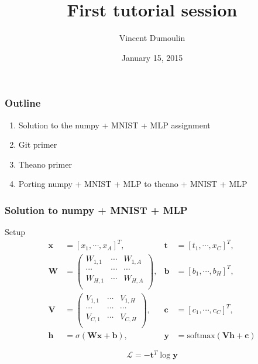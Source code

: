 \documentclass[mathserif, xcolor=dvipsnames]{beamer}
\title{First tutorial session}
\author{Vincent Dumoulin}
\date{January 15, 2015}
\begin{document}
\begin{frame}[plain]
    \titlepage
\end{frame}

\begin{frame}
    \frametitle{Outline}
    \begin{enumerate}\addtolength{\itemsep}{1.5\baselineskip}
        \item{Solution to the numpy + MNIST + MLP assignment}
        \item{Git primer}
        \item{Theano primer}
        \item{Porting numpy + MNIST + MLP to theano + MNIST + MLP}
    \end{enumerate}
\end{frame}

\begin{frame}
    \frametitle{Solution to numpy + MNIST + MLP}

    \begin{block}{Setup}
    \begin{align*}
        \mathbf{x} &= [x_1, \cdots, x_A]^T,
        &\mathbf{t} &= [t_1, \cdots, x_C]^T, \\
        \mathbf{W} &= \begin{pmatrix}
            W_{1,1} & \cdots & W_{1,A} \\
            \cdots  & \cdots & \cdots  \\
            W_{H,1} & \cdots & W_{H,A} \\
        \end{pmatrix},
        &\mathbf{b} &= [b_1, \cdots, b_H]^T, \\
        \mathbf{V} &= \begin{pmatrix}
            V_{1,1} & \cdots & V_{1,H} \\
            \cdots  & \cdots & \cdots  \\
            V_{C,1} & \cdots & V_{C,H} \\
        \end{pmatrix},
        &\mathbf{c} &= [c_1, \cdots, c_C]^T, \\
        \mathbf{h} &= \sigma(\mathbf{W}\mathbf{x} + \mathbf{b}),
        &\mathbf{y} &= \textrm{softmax}(\mathbf{V}\mathbf{h} + \mathbf{c})
    \end{align*}

    \begin{equation*}
        \mathcal{L} = -\mathbf{t}^T \log \mathbf{y}
    \end{equation*}
    \end{block}
\end{frame}
\end{document}

